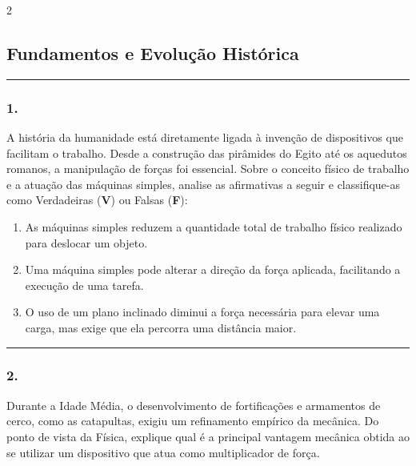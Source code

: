 \documentclass[twoside, 10pt, a4paper]{article}
\newlength{\espacoPosTitulo}\setlength{\espacoPosTitulo}{0.3cm}
\newlength{\espacoPreQuestao}\setlength{\espacoPreQuestao}{0.1cm}
\newlength{\espacoQuestao}\setlength{\espacoQuestao}{0.2cm}
\newlength{\espacoAlt}\setlength{\espacoAlt}{0.2cm}
\begin{document}
\par\vspace{0.3cm} 
\raggedcolumns
\begin{multicols*}{2}
\vspace{0.1cm}

\subsection*{Fundamentos e Evolução Histórica}
\vspace{-0.2cm}\noindent\rule{\linewidth}{1.5pt} 
\par\vspace{\espacoPosTitulo}
\subsubsection*{1.} A história da humanidade está diretamente ligada à invenção de dispositivos que facilitam o trabalho. Desde a construção das pirâmides do Egito até os aquedutos romanos, a manipulação de forças foi essencial. Sobre o conceito físico de trabalho e a atuação das máquinas simples, analise as afirmativas a seguir e classifique-as como Verdadeiras (\textbf{V}) ou Falsas (\textbf{F}):
\begin{enumerate}[label=\Roman*., itemsep=\espacoAlt]
    \item As máquinas simples reduzem a quantidade total de trabalho físico realizado para deslocar um objeto.
    \item Uma máquina simples pode alterar a direção da força aplicada, facilitando a execução de uma tarefa.
    \item O uso de um plano inclinado diminui a força necessária para elevar uma carga, mas exige que ela percorra uma distância maior.
\end{enumerate}
\par\vspace{\espacoQuestao}

\noindent\textcolor{CorLinha}{\rule{\linewidth}{0.5pt}} 
\par\vspace{\espacoPreQuestao}
\subsubsection*{2.} Durante a Idade Média, o desenvolvimento de fortificações e armamentos de cerco, como as catapultas, exigiu um refinamento empírico da mecânica. Do ponto de vista da Física, explique qual é a principal vantagem mecânica obtida ao se utilizar um dispositivo que atua como multiplicador de força.
\par\vspace{\espacoQuestao}


\end{multicols*}
\end{document}
